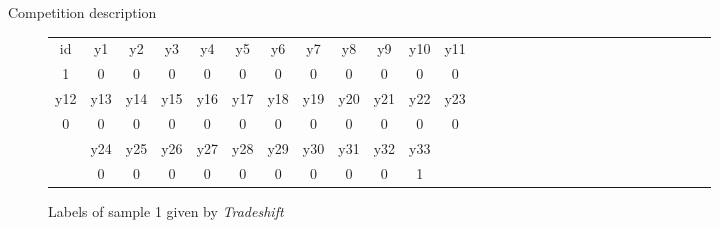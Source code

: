 \documentclass{beamer}
\begin{document}
	\begin{frame}{Competition description}

		\begin{figure}
			\centering
			\begin{tabular}{ccccccccccccccccccccccccccccc}
				id & y1 & y2 & y3 & y4 & y5 & y6 & y7 & y8 & y9 & y10 & y11 \\ 
				1 & 0 & 0 & 0 & 0 & 0 & 0 & 0 & 0 & 0 & 0 & 0 \\
				\hline
				y12 & y13 & y14 & y15 & y16 & y17 & y18 & y19 & y20 & y21 & y22 & y23 \\
				0 & 0 & 0 & 0 & 0 & 0 & 0 & 0 & 0 & 0 & 0 & 0 \\
				\hline
				&y24 & y25 & y26 & y27 & y28 & y29 & y30 & y31 & y32 & y33 \\
				&0 & 0 & 0 & 0 & 0 & 0 & 0 & 0 & 0 & 1
			\end{tabular}
			\caption{Labels of sample 1 given by \textit{Tradeshift}}
			\label{fig:sample1_labels}
		\end{figure}

	\end{frame}
\end{document}
